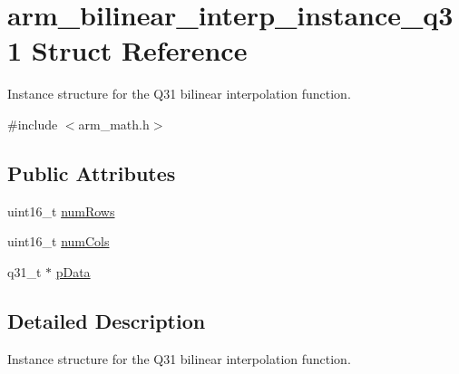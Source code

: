 \hypertarget{structarm__bilinear__interp__instance__q31}{\section{arm\-\_\-bilinear\-\_\-interp\-\_\-instance\-\_\-q31 Struct Reference}
\label{structarm__bilinear__interp__instance__q31}
}


Instance structure for the Q31 bilinear interpolation function.  




{\ttfamily \#include $<$arm\-\_\-math.\-h$>$}

\subsection*{Public Attributes}
\begin{DoxyCompactItemize}
\item 
uint16\-\_\-t \hyperlink{structarm__bilinear__interp__instance__q31_a2082e3eac56354d75291f03e96ce4aa5}{num\-Rows}
\item 
uint16\-\_\-t \hyperlink{structarm__bilinear__interp__instance__q31_a6c3eff4eb17ff1d43f170efb84713a2d}{num\-Cols}
\item 
q31\-\_\-t $\ast$ \hyperlink{structarm__bilinear__interp__instance__q31_a843eae0c9db5f815e77e1aaf9afea358}{p\-Data}
\end{DoxyCompactItemize}


\subsection{Detailed Description}
Instance structure for the Q31 bilinear interpolation function. 

